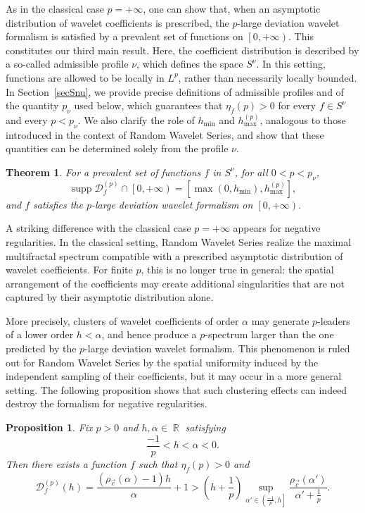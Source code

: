 \documentclass[a4paper,11pt,oneside]{article}
\DeclareMathOperator{\R}{\mathbb{R}}
\newcommand{\coint}[1]{\left[{#1}\right)}
\newcommand{\ccint}[1]{\left[{#1}\right]}
\newcommand{\ocint}[1]{\left({#1}\right]}
\theoremstyle{definition}
\theoremstyle{plain}
\newtheorem{prop}[defi]{Proposition}
\newtheorem{thm}[defi]{Theorem}
\begin{document}
As in the classical case $p=+\infty$, one can show that, when an asymptotic distribution of wavelet coefficients is prescribed, the $p$-large deviation wavelet formalism is satisfied by a prevalent set of functions on $\coint{0,+\infty}$. This constitutes our third main result. Here, the coefficient distribution is described by a so-called admissible profile $\nu$, which defines the space $S^\nu$. In this setting, functions are allowed to be locally in $L^p$, rather than necessarily locally bounded. In Section~\ref{secSnu}, we provide precise definitions of admissible profiles and of the quantity $p_\nu$ used below, which guarantees that $\eta_f(p)>0$ for every $f\in S^\nu$ and every $p<p_\nu$. We also clarify the role of $h_{\min}$ and $h_{\max}^{(p)}$, analogous to those introduced in the context of Random Wavelet Series, and show that these quantities can be determined solely from the profile $\nu$.

\begin{thm}\label{mainPrev}
For a prevalent set of functions $f$ in $S^\nu$, for all $0<p<p_\nu$,
\[
\operatorname{supp}\mathscr{D}_f^{(p)}\cap\coint{0,+\infty}
=
\ccint{\max(0,h_{\min}),h_{\max}^{(p)}},
\]
and $f$ satisfies the $p$-large deviation wavelet formalism on $\coint{0,+\infty}$.
\end{thm}

A striking difference with the classical case $p=+\infty$ appears for negative regularities. In the classical setting, Random Wavelet Series realize the maximal multifractal spectrum compatible with a prescribed asymptotic distribution of wavelet coefficients. For finite $p$, this is no longer true in general: the spatial arrangement of the coefficients may create additional singularities that are not captured by their asymptotic distribution alone.

More precisely, clusters of wavelet coefficients of order $\alpha$ may generate $p$-leaders of a lower order $h<\alpha$, and hence produce a $p$-spectrum larger than the one predicted by the $p$-large deviation wavelet formalism. This phenomenon is ruled out for Random Wavelet Series by the spatial uniformity induced by the independent sampling of their coefficients, but it may occur in a more general setting. The following proposition shows that such clustering effects can indeed destroy the formalism for negative regularities.

\begin{prop}\label{prop:CounterEx}
Fix $p>0$ and $h,\alpha\in\R$ satisfying
\[
\frac{-1}{p}<h<\alpha<0.
\]
Then there exists a function $f$ such that $\eta_f(p)>0$ and
\[
\mathscr{D}_f^{(p)}(h)
=
\frac{(\rho_{\vec{c}}(\alpha)-1)h}{\alpha}+1
>
\left(h+\frac{1}{p}\right)
\sup_{\alpha'\in\ocint{\frac{-1}{p},h}}
\frac{\rho_{\vec{c}}(\alpha')}{\alpha'+\frac{1}{p}}
.
\]
\end{prop}
\end{document}
